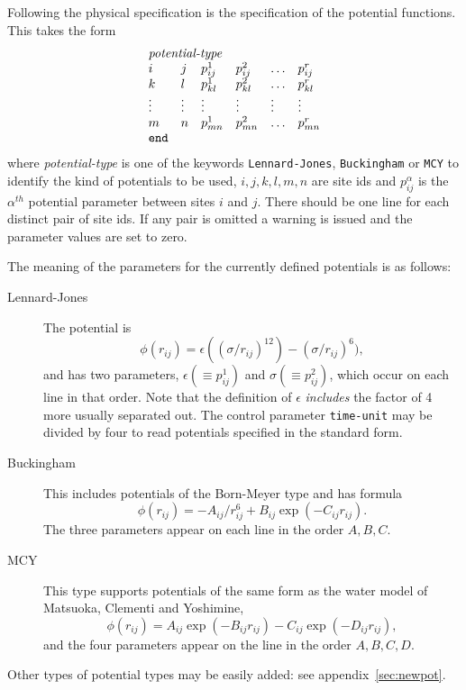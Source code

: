 \documentclass[twoside]{report}
\begin{document}
Following the physical specification is the specification of the
potential functions. This takes the form
\begin{displaymath}
\begin{array}{llllll}
\multicolumn{4}{l}{\mbox{{\it potential-type}}} \\
i & j & p^{1}_{ij} & p^{2}_{ij} & \ldots & p^{r}_{ij}  \\
k & l & p^{1}_{kl} & p^{2}_{kl} & \ldots & p^{r}_{kl}  \\
\vdots & \vdots & \vdots & \vdots & \vdots & \vdots \\
m & n & p^{1}_{mn} & p^{2}_{mn} & \ldots & p^{r}_{mn}  \\
\mbox{\texttt{end}} \\
\end{array}
\end{displaymath}
where {\it potential-type\/} is one of the keywords
\texttt{Lennard-Jones}, \texttt{Buckingham} or \texttt{MCY} to identify the kind of
potentials to be used,  $i, j, k, l, m, n$ are site ids and
$p^{\alpha}_{ij}$ is the $\alpha^{th}$ potential parameter between
sites $i$ and $j$.  There should be one line for each distinct pair of
site ids.  If any pair is omitted a warning is issued and the
parameter values are set to zero.

The meaning of the parameters for the currently defined potentials is
as follows:
\begin{description}
\item[Lennard-Jones] The potential is 
\[\phi(r_{ij}) = \epsilon((\sigma/r_{ij})^{12}) -
(\sigma/r_{ij})^{6}),\] and has two parameters, $\epsilon ( \equiv p^{1}_{ij})$
and $\sigma ( \equiv p^{2}_{ij})$, which occur on each line in that
order.  Note that the definition of $\epsilon$ {\em includes}\/ the
factor of 4 more usually separated out.  The control parameter
\texttt{time-unit} may be divided by four to read potentials
specified in the standard form.

\item[Buckingham] This includes potentials of the Born-Meyer type and
has formula \[\phi(r_{ij}) = -A_{ij}/r^{6}_{ij} + B_{ij}\exp(-C_{ij}r_{ij}).\]
The three parameters appear on each line in the order $A, B, C$.
\item[MCY] This type supports potentials of the same form as the water
model of Matsuoka, Clementi and Yoshimine\cite{matsuoka:75}, 
\[\phi(r_{ij}) = A_{ij}\exp(-B_{ij}r_{ij}) - C_{ij}\exp(-D_{ij}r_{ij}),\]
and the four parameters appear on the line in the order $A, B, C, D$.
\end{description}
Other types of potential types may be easily added: see
appendix~\ref{sec:newpot}.
\end{document}
